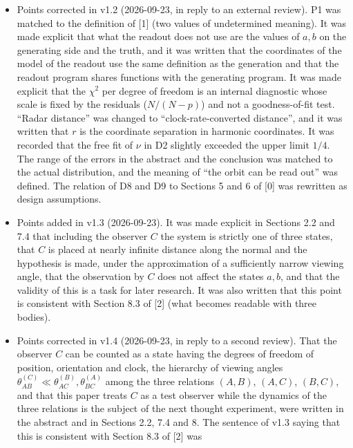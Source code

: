 \documentclass[
  a4paper,
]{article}
\begin{document}
\begin{itemize}
  the model computation of the readout was checked with D2 (Section
  7.4).
\item
  Points corrected in v1.2 (2026-09-23, in reply to an external review).
  P1 was matched to the definition of {[}1{]} (two values of
  undetermined meaning). It was made explicit that what the readout does
  not use are the values of \(a, b\) on the generating side and the
  truth, and it was written that the coordinates of the model of the
  readout use the same definition as the generation and that the readout
  program shares functions with the generating program. It was made
  explicit that the \(\chi^2\) per degree of freedom is an internal
  diagnostic whose scale is fixed by the residuals (\(N/(N-p)\)) and not
  a goodness-of-fit test. ``Radar distance'' was changed to
  ``clock-rate-converted distance'', and it was written that \(r\) is
  the coordinate separation in harmonic coordinates. It was recorded
  that the free fit of \(\nu\) in D2 slightly exceeded the upper limit
  \(1/4\). The range of the errors in the abstract and the conclusion
  was matched to the actual distribution, and the meaning of ``the orbit
  can be read out'' was defined. The relation of D8 and D9 to Sections 5
  and 6 of {[}0{]} was rewritten as design assumptions.
\item
  Points added in v1.3 (2026-09-23). It was made explicit in Sections
  2.2 and 7.4 that including the observer \(C\) the system is strictly
  one of three states, that \(C\) is placed at nearly infinite distance
  along the normal and the hypothesis is made, under the approximation
  of a sufficiently narrow viewing angle, that the observation by \(C\)
  does not affect the states \(a, b\), and that the validity of this is
  a task for later research. It was also written that this point is
  consistent with Section 8.3 of {[}2{]} (what becomes readable with
  three bodies).
\item
  Points corrected in v1.4 (2026-09-23, in reply to a second review).
  That the observer \(C\) can be counted as a state having the degrees
  of freedom of position, orientation and clock, the hierarchy of
  viewing angles
  \(\theta_{AB}^{(C)}\ll\theta_{AC}^{(B)},\theta_{BC}^{(A)}\) among the
  three relations \((A,B)\), \((A,C)\), \((B,C)\), and that this paper
  treats \(C\) as a test observer while the dynamics of the three
  relations is the subject of the next thought experiment, were written
  in the abstract and in Sections 2.2, 7.4 and 8. The sentence of v1.3
  saying that this is consistent with Section 8.3 of {[}2{]} was

\end{itemize}
\end{document}
